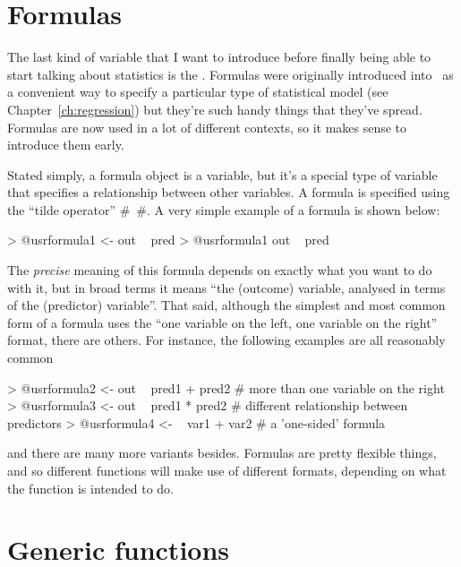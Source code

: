 \section{Formulas\label{sec:formulas}}
 
The last kind of variable that I want to introduce before finally being able to start talking about statistics is the . Formulas were originally introduced into \R\ as a convenient way to specify a particular type of statistical model (see Chapter~\ref{ch:regression}) but they're such handy things that they've spread. Formulas are now used in a lot of different contexts, so it makes sense to introduce them early.

Stated simply, a formula object is a variable, but it's a special type of variable that specifies a relationship between other variables. A formula is specified using the ``tilde operator'' \rtextverb#~#. A very simple example of a formula is shown below:
\begin{rblock1}
> @usr{formula1 <- out ~ pred}
> @usr{formula1}
out ~ pred
\end{rblock1}
The {\it precise} meaning of this formula depends on exactly what you want to do with it, but in broad terms it means ``the  (outcome) variable, analysed in terms of the  (predictor) variable''. That said, although the simplest and most common form of a formula uses the  ``one variable on the left, one variable on the right'' format, there are others. For instance, the following examples are all reasonably common
\begin{rblock1}
> @usr{formula2 <-  out ~ pred1 + pred2}   # more than one variable on the right
> @usr{formula3 <-  out ~ pred1 * pred2}   # different relationship between predictors 
> @usr{formula4 <-  ~ var1 + var2}         # a 'one-sided' formula
\end{rblock1}
and there are many more variants besides. Formulas are pretty flexible things, and so different functions will make use of different formats, depending on what the function is intended to do.


\section{Generic functions~\label{sec:generics}}

